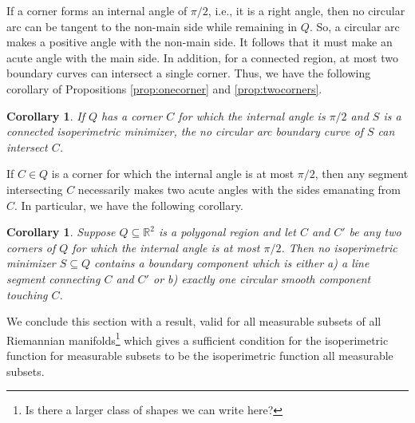 \documentclass[leqno]{article}
\numberwithin{equation}{section}
\theoremstyle{definition}
\theoremstyle{remark}
\theoremstyle{plain}
\newtheorem{corollary}[equation]{Corollary}
\begin{document}
If a corner forms an internal angle of $\pi/2$, i.e., it is a right angle, then no circular arc can be tangent to the non-main side while remaining in $Q$.  So, a circular arc makes a positive angle with the non-main side.  It follows that it must make an acute angle with the main side.  In addition, for a connected region, at most two boundary curves can intersect a single corner.  Thus, we have the following corollary of Propositions  \ref{prop:onecorner} and \ref{prop:twocorners}.

\begin{corollary}\label{cor:nocornercurve} If $Q$ has a corner $C$ for which the internal angle is $\pi/2$ and $S$ is a connected isoperimetric minimizer, the no circular arc boundary curve of $S$ can intersect $C$.

\end{corollary}

If $C\in Q$ is a corner for which the internal angle is at most $\pi/2$, then any segment intersecting $C$ necessarily makes two acute angles with the sides emanating from $C$.  In particular, we have the following corollary.

\begin{corollary}  Suppose $Q\subseteq\mathbb{R}^2$ is a polygonal region and let $C$ and $C'$ be any two corners of $Q$ for which the internal angle is at most $\pi/2$.  Then no isoperimetric minimizer $S\subseteq Q$ contains a boundary component which is either a) a line segment connecting $C$ and $C'$ or b) exactly one circular smooth component touching $C$.

\end{corollary}

\fi






\iffalse 

We conclude this section with a result, valid for all measurable subsets of all Riemannian manifolds\footnote{{\color{blue} Is there a larger class of shapes we can write here?}} which gives a sufficient condition for the isoperimetric function for  measurable subsets to be the isoperimetric function all measurable subsets.
\end{document}
